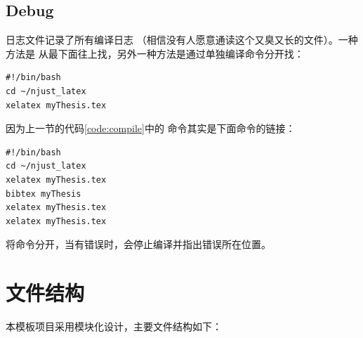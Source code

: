\subsection{Debug}

日志文件记录了所有编译日志
（相信没有人愿意通读这个又臭又长的文件）。一种方法是
从最下面往上找，另外一种方法是通过单独编译命令分开找：

\begin{lstlisting}[style=myshell,caption=第一条子命令]
#!/bin/bash
cd ~/njust_latex
xelatex myThesis.tex
\end{lstlisting}

因为上一节的代码\ref{code:compile}中的
命令其实是下面命令的链接：

\begin{lstlisting}[style=myshell,caption=基本测试]
#!/bin/bash
cd ~/njust_latex
xelatex myThesis.tex
bibtex myThesis
xelatex myThesis.tex
xelatex myThesis.tex
\end{lstlisting}

将命令分开，当有错误时，会停止编译并指出错误所在位置。

\section{文件结构}

本模板项目采用模块化设计，主要文件结构如下：

